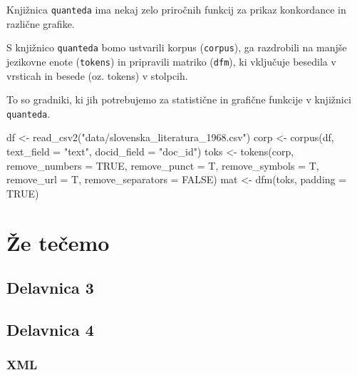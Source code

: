 \documentclass[
  letterpaper,
]{scrbook}
\newenvironment{Shaded}{\begin{snugshade}}{\end{snugshade}}
\newcommand{\AttributeTok}[1]{\textcolor[rgb]{0.40,0.45,0.13}{#1}}
\newcommand{\ConstantTok}[1]{\textcolor[rgb]{0.56,0.35,0.01}{#1}}
\newcommand{\FunctionTok}[1]{\textcolor[rgb]{0.28,0.35,0.67}{#1}}
\newcommand{\NormalTok}[1]{\textcolor[rgb]{0.00,0.23,0.31}{#1}}
\newcommand{\OtherTok}[1]{\textcolor[rgb]{0.00,0.23,0.31}{#1}}
\newcommand{\StringTok}[1]{\textcolor[rgb]{0.13,0.47,0.30}{#1}}
\begin{document}
Knjižnica \texttt{quanteda} ima nekaj zelo priročnih funkcij za prikaz
konkordance in različne grafike.

S knjižnico \texttt{quanteda} bomo ustvarili korpus (\texttt{corpus}),
ga razdrobili na manjše jezikovne enote (\texttt{tokens}) in pripravili
matriko (\texttt{dfm}), ki vključuje besedila v vrsticah in besede (oz.
tokens) v stolpcih.

To so gradniki, ki jih potrebujemo za statistične in grafične funkcije v
knjižnici \texttt{quanteda}.

\begin{Shaded}
\begin{Highlighting}[]
\NormalTok{df }\OtherTok{\textless{}{-}} \FunctionTok{read\_csv2}\NormalTok{(}\StringTok{"data/slovenska\_literatura\_1968.csv"}\NormalTok{)}
\NormalTok{corp }\OtherTok{\textless{}{-}} \FunctionTok{corpus}\NormalTok{(df, }\AttributeTok{text\_field =} \StringTok{"text"}\NormalTok{, }\AttributeTok{docid\_field =} \StringTok{"doc\_id"}\NormalTok{)}
\NormalTok{toks }\OtherTok{\textless{}{-}} \FunctionTok{tokens}\NormalTok{(corp, }\AttributeTok{remove\_numbers =} \ConstantTok{TRUE}\NormalTok{, }\AttributeTok{remove\_punct =}\NormalTok{ T,}
               \AttributeTok{remove\_symbols =}\NormalTok{ T, }\AttributeTok{remove\_url =}\NormalTok{ T, }
               \AttributeTok{remove\_separators =} \ConstantTok{FALSE}\NormalTok{)}
\NormalTok{mat }\OtherTok{\textless{}{-}} \FunctionTok{dfm}\NormalTok{(toks, }\AttributeTok{padding =} \ConstantTok{TRUE}\NormalTok{)}
\end{Highlighting}
\end{Shaded}

\part{Že tečemo}

\hypertarget{sec-delavnica3}{%
\chapter{Delavnica 3}\label{sec-delavnica3}}

\hypertarget{sec-delavnica4}{%
\chapter{Delavnica 4}\label{sec-delavnica4}}

\hypertarget{xml}{%
\section{XML}\label{xml}}
\end{document}

